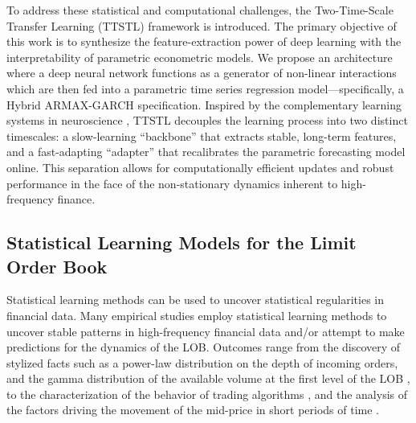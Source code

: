\documentclass{rQUF2e}
\theoremstyle{plain}
\theoremstyle{definition}
\theoremstyle{remark}
\begin{document}
To address these statistical and computational challenges, the Two-Time-Scale Transfer Learning (TTSTL) framework is introduced. The primary objective of this work is to synthesize the feature-extraction power of deep learning with the interpretability of parametric econometric models. We propose an architecture where a deep neural network functions as a generator of non-linear interactions which are then fed into a parametric time series regression model—specifically, a Hybrid ARMAX-GARCH specification. Inspired by the complementary learning systems in neuroscience \citep{pham_continual_2024}, TTSTL decouples the learning process into two distinct timescales: a slow-learning ``backbone'' that extracts stable, long-term features, and a fast-adapting ``adapter'' that recalibrates the parametric forecasting model online. This separation allows for computationally efficient updates and robust performance in the face of the non-stationary dynamics inherent to high-frequency finance.

\subsection{Statistical Learning Models for the Limit Order Book}
\label{SubSect:LM}
Statistical learning methods \citep{hastie2017elements} can be used to uncover statistical regularities in financial data. Many empirical studies employ statistical learning methods to uncover stable patterns in high-frequency financial data and/or attempt to make predictions for the dynamics of the LOB. Outcomes range from the discovery of stylized facts such as a power-law distribution on the depth of incoming orders, and the gamma distribution of the available volume at the first level of the LOB \citep{Bouchaud_2002}, to the characterization of the behavior of trading algorithms \citep{cartea2023statistical}, and the analysis of the factors driving the movement of the mid-price in short periods of time \citep{cont2013price, cont2023cross, CENESIZOGLU202277}.
\end{document}

